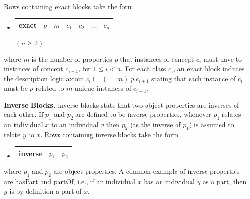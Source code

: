 \documentclass[5p,authoryear]{elsarticle}
\newcommand{\myblock}[1]{\vspace{12pt}\noindent\textbf{#1}}
\begin{document}
Rows containing exact blocks take the form
\begin{itemize}
\item[]
  \begin{tabular}{|l|l|l|l|l|l|l|}\hline \textsf{exact} & $p$ & $m$ & 
    $c_1$ & $c_2$ & $\dots$ & $c_n$
    \\ \hline
  \end{tabular} \hfill $(n \ge 2)$
\end{itemize}
where $m$ is the number of properties $p$ that instances of concept
$c_i$ must have to instances of concept $c_{i+1}$, for $1 \le i < n$.
For each class $c_i$, an exact block induces the description logic
axiom $c_i \sqsubseteq \; (= m) \; p.c_{i+1}$ stating that each
instance of $c_i$ must be $p$-related to $m$ unique instances of
$c_{i+1}$.

\myblock{Inverse Blocks.} Inverse blocks state that two object
properties are inverses of each other. If $p_1$ and $p_2$ are defined
to be inverse properties, whenever $p_1$ relates an individual $x$
to an individual $y$ then $p_2$ (as the inverse of $p_1$) is assumed
to relate $y$ to $x$.  Rows containing inverse blocks take the
form
\begin{itemize}
\item[]
  \begin{tabular}{|l|l|l|}\hline \textsf{inverse} & $p_1$ & $p_2$
\\ \hline
  \end{tabular}
\end{itemize}
where $p_1$ and $p_2$ are object properties. A common example of
inverse properties are \textsf{hasPart} and \textsf{partOf}, i.e., if
an individual $x$ has an individual $y$ as a part, then $y$ is
by definition a part of $x$.


\end{document}
